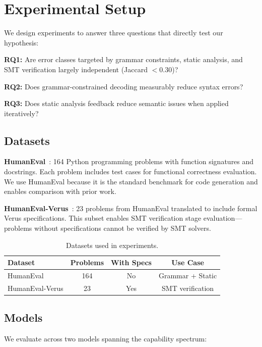 \section{Experimental Setup}
\label{sec:setup}

We design experiments to answer three questions that directly test our hypothesis:

\textbf{RQ1:} Are error classes targeted by grammar constraints, static analysis, and SMT verification largely independent (Jaccard $< 0.30$)?

\textbf{RQ2:} Does grammar-constrained decoding measurably reduce syntax errors?

\textbf{RQ3:} Does static analysis feedback reduce semantic issues when applied iteratively?

\subsection{Datasets}

\textbf{HumanEval}~\cite{chen2021evaluating}: 164 Python programming problems with function signatures and docstrings. Each problem includes test cases for functional correctness evaluation. We use HumanEval because it is the standard benchmark for code generation and enables comparison with prior work.

\textbf{HumanEval-Verus}~\cite{humaneval_verus2024}: 23 problems from HumanEval translated to include formal Verus specifications. This subset enables SMT verification stage evaluation---problems without specifications cannot be verified by SMT solvers.

\begin{table}[h]
\centering
\begin{tabular}{lccc}
\toprule
Dataset & Problems & With Specs & Use Case \\
\midrule
HumanEval & 164 & No & Grammar + Static \\
HumanEval-Verus & 23 & Yes & SMT verification \\
\bottomrule
\end{tabular}
\caption{Datasets used in experiments.}
\label{tab:datasets}
\end{table}

\subsection{Models}

We evaluate across two models spanning the capability spectrum:

